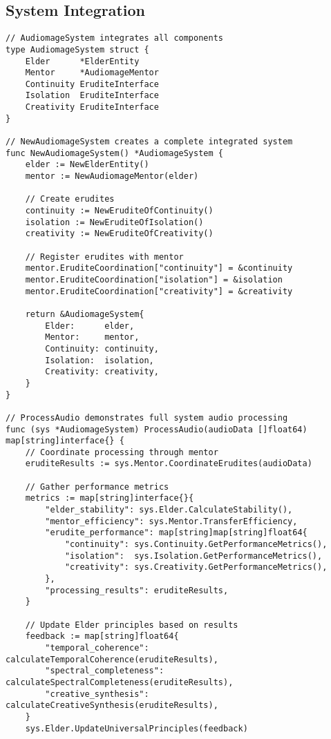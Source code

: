 \subsection{System Integration}

\begin{tcolorbox}[colback=CodeBackground, colframe=DarkGray, title=Complete System Integration, fonttitle=\bfseries]
\begin{verbatim}
// AudiomageSystem integrates all components
type AudiomageSystem struct {
    Elder      *ElderEntity
    Mentor     *AudiomageMentor
    Continuity EruditeInterface
    Isolation  EruditeInterface
    Creativity EruditeInterface
}

// NewAudiomageSystem creates a complete integrated system
func NewAudiomageSystem() *AudiomageSystem {
    elder := NewElderEntity()
    mentor := NewAudiomageMentor(elder)
    
    // Create erudites
    continuity := NewEruditeOfContinuity()
    isolation := NewEruditeOfIsolation()
    creativity := NewEruditeOfCreativity()
    
    // Register erudites with mentor
    mentor.EruditeCoordination["continuity"] = &continuity
    mentor.EruditeCoordination["isolation"] = &isolation
    mentor.EruditeCoordination["creativity"] = &creativity
    
    return &AudiomageSystem{
        Elder:      elder,
        Mentor:     mentor,
        Continuity: continuity,
        Isolation:  isolation,
        Creativity: creativity,
    }
}

// ProcessAudio demonstrates full system audio processing
func (sys *AudiomageSystem) ProcessAudio(audioData []float64) map[string]interface{} {
    // Coordinate processing through mentor
    eruditeResults := sys.Mentor.CoordinateErudites(audioData)
    
    // Gather performance metrics
    metrics := map[string]interface{}{
        "elder_stability": sys.Elder.CalculateStability(),
        "mentor_efficiency": sys.Mentor.TransferEfficiency,
        "erudite_performance": map[string]map[string]float64{
            "continuity": sys.Continuity.GetPerformanceMetrics(),
            "isolation":  sys.Isolation.GetPerformanceMetrics(),
            "creativity": sys.Creativity.GetPerformanceMetrics(),
        },
        "processing_results": eruditeResults,
    }
    
    // Update Elder principles based on results
    feedback := map[string]float64{
        "temporal_coherence":   calculateTemporalCoherence(eruditeResults),
        "spectral_completeness": calculateSpectralCompleteness(eruditeResults),
        "creative_synthesis":   calculateCreativeSynthesis(eruditeResults),
    }
    sys.Elder.UpdateUniversalPrinciples(feedback)
    

\end{verbatim}
\end{tcolorbox}
